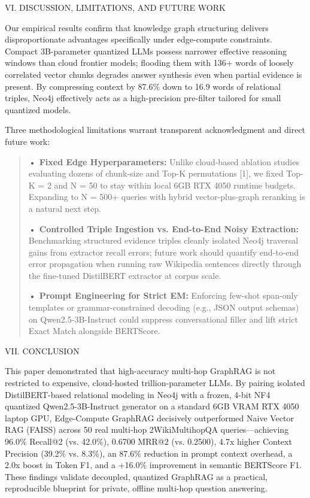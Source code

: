 \textsc{VI. DISCUSSION, LIMITATIONS, AND FUTURE WORK}

Our empirical results confirm that knowledge graph structuring delivers
disproportionate advantages specifically under edge-compute constraints.
Compact 3B-parameter quantized LLMs possess narrower effective reasoning
windows than cloud frontier models; flooding them with 136+ words of
loosely correlated vector chunks degrades answer synthesis even when
partial evidence is present. By compressing context by 87.6\% down to
16.9 words of relational triples, Neo4j effectively acts as a
high-precision pre-filter tailored for small quantized models.

Three methodological limitations warrant transparent acknowledgment and
direct future work:

\begin{quote}
\textbf{• Fixed Edge Hyperparameters:} Unlike cloud-based ablation
studies evaluating dozens of chunk-size and Top-K permutations {[}1{]},
we fixed Top-K = 2 and N = 50 to stay within local 6GB RTX 4050 runtime
budgets. Expanding to N = 500+ queries with hybrid vector-plus-graph
reranking is a natural next step.

\textbf{• Controlled Triple Ingestion vs. End-to-End Noisy Extraction:}
Benchmarking structured evidence triples cleanly isolated Neo4j
traversal gains from extractor recall errors; future work should
quantify end-to-end error propagation when running raw Wikipedia
sentences directly through the fine-tuned DistilBERT extractor at corpus
scale.

\textbf{• Prompt Engineering for Strict EM:} Enforcing few-shot
span-only templates or grammar-constrained decoding (e.g., JSON output
schemas) on Qwen2.5-3B-Instruct could suppress conversational filler and
lift strict Exact Match alongside BERTScore.
\end{quote}

\textsc{VII. CONCLUSION}

This paper demonstrated that high-accuracy multi-hop GraphRAG is not
restricted to expensive, cloud-hosted trillion-parameter LLMs. By
pairing isolated DistilBERT-based relational modeling in Neo4j with a
frozen, 4-bit NF4 quantized Qwen2.5-3B-Instruct generator on a standard
6GB VRAM RTX 4050 laptop GPU, Edge-Compute GraphRAG decisively
outperformed Naive Vector RAG (FAISS) across 50 real multi-hop
2WikiMultihopQA queries---achieving 96.0\% Recall@2 (vs. 42.0\%), 0.6700
MRR@2 (vs. 0.2500), 4.7x higher Context Precision (39.2\% vs. 8.3\%), an
87.6\% reduction in prompt context overhead, a 2.0x boost in Token F1,
and a +16.0\% improvement in semantic BERTScore F1. These findings
validate decoupled, quantized GraphRAG as a practical, reproducible
blueprint for private, offline multi-hop question answering.

